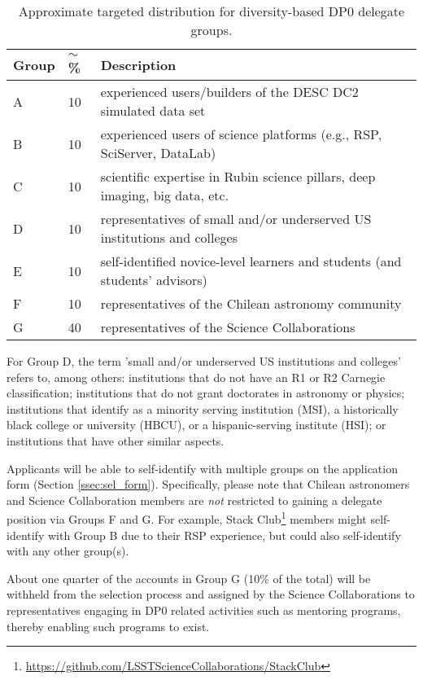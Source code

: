 \documentclass[DM,lsstdraft,authoryear,toc]{lsstdoc}
\begin{document}
\begin{table}[!h]
\centering
\caption{Approximate targeted distribution for diversity-based DP0 delegate groups.}\label{tab:delegate_groups}
\begin{tabular}{lll}
\hline
Group & $\sim$\% & Description \\
\hline \hline
A & 10 & experienced users/builders of the DESC DC2 simulated data set \\
B & 10 & experienced users of science platforms (e.g., RSP, SciServer, DataLab) \\
C & 10 & scientific expertise in Rubin science pillars, deep imaging, big data, etc. \\
D & 10 & representatives of small and/or underserved US institutions and colleges \\
E & 10 & self-identified novice-level learners and students (and students' advisors) \\
F & 10 & representatives of the Chilean astronomy community \\
G & 40 & representatives of the Science Collaborations \\
\hline
\end{tabular}
\end{table}

For Group D, the term 'small and/or underserved US institutions and colleges' refers to, among others: institutions that do not have an R1 or R2 Carnegie classification; institutions that do not grant doctorates in astronomy or physics; institutions that identify as a minority serving institution (MSI), a historically black college or university (HBCU), or a hispanic-serving institute (HSI); or institutions that have other similar aspects.

Applicants will be able to self-identify with multiple groups on the application form (Section \ref{ssec:sel_form}).
Specifically, please note that Chilean astronomers and Science Collaboration members are {\it not} restricted to gaining a delegate position via Groups F and G. 
For example, Stack Club\footnote{\url{https://github.com/LSSTScienceCollaborations/StackClub}} members might self-identify with Group B due to their RSP experience, but could also self-identify with any other group(s).

About one quarter of the accounts in Group G (10\% of the total) will be withheld from the selection process and assigned by the Science Collaborations to representatives engaging in DP0 related activities such as mentoring programs, thereby enabling such programs to exist.
\end{document}
